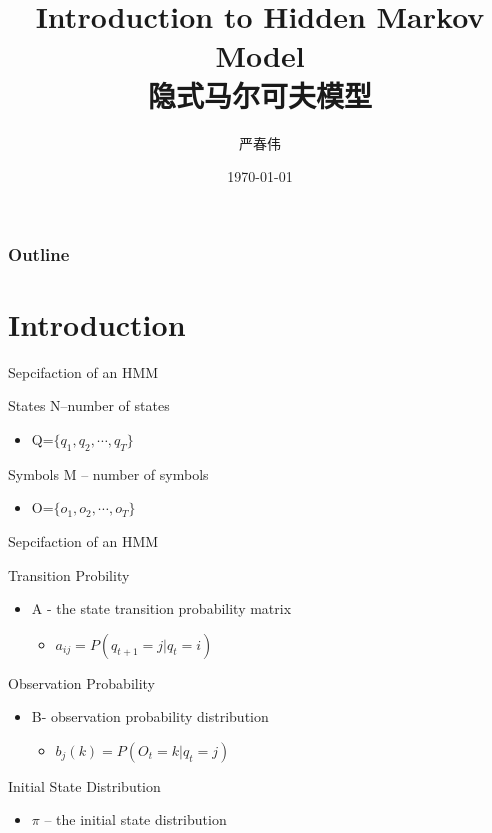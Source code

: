 \documentclass{beamer}
\title{Introduction to Hidden Markov Model\\ 隐式马尔可夫模型}
\author{严春伟}
\institute[PKUSZ]{
    互联网研发中心\\
}
\date{\today}
\begin{document}
\begin{frame}
  \titlepage
\end{frame}

\begin{frame}
\frametitle{Outline}
\tableofcontents
\end{frame}

\section{Introduction}
\begin{frame}{Sepcifaction of an HMM}
    \begin{block}{States}
    N--number of states
    \begin{itemize}
    \item Q=$\{ q_1, q_2, \cdots, q_T \}$
    \end{itemize}
    \end{block}

    \begin{block}{Symbols}
    M -- number of symbols
    \begin{itemize}
    \item O=$\{ o_1, o_2, \cdots, o_T \}$
    \end{itemize}
    \end{block}
\end{frame}

\begin{frame}{Sepcifaction of an HMM}
    \begin{block}{Transition Probility}
        \begin{itemize}
        \item A - the state transition probability matrix
            \begin{itemize}
            \item $a_{ij} = P(q_{t+1} = j | q_{t}=i)$
            \end{itemize}
        \end{itemize}
    \end{block}

    \begin{block}{Observation Probability}
        \begin{itemize}
        \item B- observation probability distribution
            \begin{itemize}
            \item $b_j{(k)} = P(O_t=k|q_t=j)$
            \end{itemize}
        \end{itemize}
    \end{block}
    
    \begin{block}{Initial State Distribution}
        \begin{itemize}
        \item $\pi$ -- the initial state distribution
        \end{itemize}
    \end{block}
\end{frame}
\end{document}
